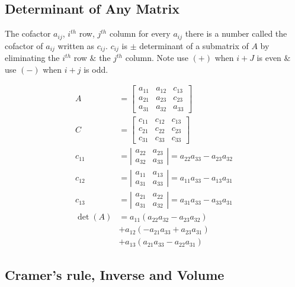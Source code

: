\documentclass[main.tex]{subfiles}
\begin{document}
\subsection{Determinant of Any Matrix}

The cofactor $a_{ij}$, $i^{th}$ row, $j^{th}$ column for every $a_{ij}$ there is a number called the cofactor of $a_{ij}$ written as $c_{ij}$. $c_{ij}$ is $\pm$ determinant of a submatrix of $A$ by eliminating the $i^{th}$ row $\&$ the $j^{th}$ column. Note use $(+)$ when $i+J$ is even $\&$ use $(-)$ when $i+j$ is odd.

$$
\begin{aligned}
A &= \left[\begin{array}{lll}
a_{11} & a_{12} & c_{13} \\
a_{21} & a_{23} & c_{23} \\
a_{31} & a_{32} & a_{33}
\end{array}\right]\\
C &= \left[\begin{array}{lll}
c_{11} & c_{12} & c_{13} \\
c_{21} & c_{22} & c_{23} \\
c_{31} & c_{33} & c_{33}
\end{array}\right]\\
c_{11} &= \left|\begin{array}{ll}
a_{22} & a_{23} \\
a_{32} & a_{33}
\end{array}\right|=a_{22} a_{33}-a_{23} a_{32} \\
c_{12} &= \left|\begin{array}{ll}
a_{11} & a_{13} \\
a_{31} & a_{33}
\end{array}\right|=a_{11} a_{33}-a_{13} a_{31} \\
c_{13} &= \left|\begin{array}{ll}
a_{21} & a_{22} \\
a_{31} & a_{32}
\end{array}\right|=a_{31} a_{33}-a_{33} a_{31}\\
\operatorname{det}(A) &= a_{11}\left(a_{22} a_{32} - a_{23} a_{32}\right) \\
&+a_{12}\left(-a_{21} a_{33}+a_{23} a_{31}\right) \\
&+a_{13}\left(a_{21} a_{33}-a_{22} a_{31}\right)
\end{aligned}
$$

\subsection{Cramer's rule, Inverse and Volume}
\end{document}
